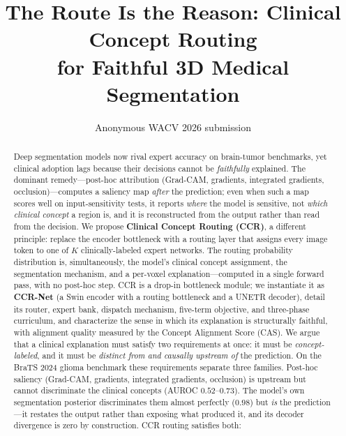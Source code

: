 \documentclass[runningheads]{llncs}
\newcommand{\todo}[1]{\textcolor{red}{[#1]}}
\begin{document}
\title{The Route Is the Reason: Clinical Concept Routing\\ for Faithful 3D Medical Segmentation}

\author{Anonymous WACV 2026 submission}
\institute{Paper ID \todo{XXXX}}

\maketitle

\begin{abstract}
Deep segmentation models now rival expert accuracy on brain-tumor benchmarks, yet
clinical adoption lags because their decisions cannot be \emph{faithfully} explained.
The dominant remedy---post-hoc attribution (Grad-CAM, gradients, integrated gradients,
occlusion)---computes a saliency map \emph{after} the prediction; even when such a map scores
well on input-sensitivity tests, it reports \emph{where} the model is sensitive, not \emph{which
clinical concept} a region is, and it is reconstructed from the output rather than read from the
decision. We propose \textbf{Clinical Concept Routing (CCR)}, a different
principle: replace the encoder bottleneck with a routing layer that assigns every image
token to one of $K$ clinically-labeled expert networks. The routing probability
distribution is, simultaneously, the model's clinical concept assignment, the
segmentation mechanism, and a per-voxel explanation---computed in a single forward pass,
with no post-hoc step. CCR is a drop-in bottleneck module; we instantiate it as \textbf{CCR-Net}
(a Swin encoder with a routing bottleneck and a UNETR decoder), detail its router, expert bank, dispatch
mechanism, five-term objective, and three-phase curriculum, and characterize the sense in which its
explanation is structurally faithful, with alignment quality measured by the Concept Alignment
Score (CAS). We argue that a clinical explanation must satisfy two requirements at once: it must be
\emph{concept-labeled}, and it must be \emph{distinct from and causally upstream of} the prediction.
On the BraTS 2024 glioma benchmark these requirements separate three families. Post-hoc saliency
(Grad-CAM, gradients, integrated gradients, occlusion) is upstream but cannot discriminate the
clinical concepts (AUROC $0.52$--$0.73$). The model's own segmentation posterior discriminates them
almost perfectly ($0.98$) but \emph{is} the prediction---it restates the output rather than exposing
what produced it, and its decoder divergence is zero by construction. CCR routing satisfies both:

\end{abstract}
\end{document}
